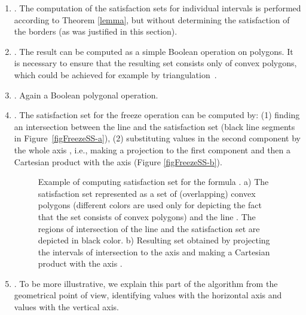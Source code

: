 \begin{enumerate}


	\item . The computation of the satisfaction sets  for individual intervals is performed according to Theorem \ref{lemma}, but without determining the satisfaction of the borders (as was justified in this section).

	\item . The result can be computed as a simple Boolean operation on polygons. It is necessary to ensure that the resulting set consists only of convex polygons, which could be achieved for example by triangulation~\cite{GeometricAlgorithms}. 
	
	\item . Again a Boolean polygonal operation. 

	\item . The satisfaction set for the freeze operation can be computed by: (1) finding an intersection between the line  and the satisfaction set  (black line segments in Figure~\ref{figFreezeSS-a}), (2) substituting values in the second component by the whole axis , i.e., making a projection to the first component  and then a Cartesian product with the axis  (Figure \ref{figFreezeSS-b}).  
	
	
	
\begin{figure}[h]
   \centering  
    	
      	\caption{Example of computing satisfaction set for the formula . a) The satisfaction set represented as a set of (overlapping) convex polygons (different colors are used only for depicting the fact that the set consists of convex polygons) and the line . The regions of intersection of the line and the satisfaction set are depicted in black color. b) Resulting set  obtained by projecting the intervals of intersection to the axis  and making a Cartesian product with the axis .}
	\label{figFreezeSS}    
    
\end{figure}



	\item \label{step} . To be more illustrative, we explain this part of the algorithm from the geometrical point of view, identifying values  with the horizontal axis and values  with the vertical axis.
	

\end{enumerate}
